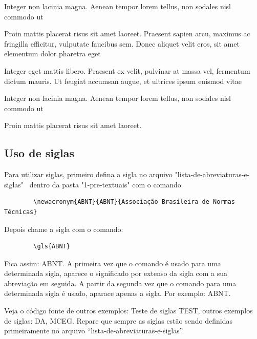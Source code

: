 

    \begin{alineascomponto}
	    \item Integer non lacinia magna. Aenean tempor lorem tellus, non sodales nisl commodo ut
	    \item Proin mattis placerat risus sit amet laoreet. Praesent sapien arcu, maximus ac fringilla efficitur, vulputate faucibus sem. Donec aliquet velit eros, sit amet elementum dolor pharetra eget
	    \item Integer eget mattis libero. Praesent ex velit, pulvinar at massa vel, fermentum dictum mauris. Ut feugiat accumsan augue, et ultrices ipsum euismod vitae
	    \begin{subalineascomponto}
		    \item Integer non lacinia magna. Aenean tempor lorem tellus, non sodales nisl commodo ut
		    \item Proin mattis placerat risus sit amet laoreet.
	    \end{subalineascomponto}
    \end{alineascomponto}

\subsection{Uso de siglas} \label{sec:siglas}

    Para utilizar siglas, primeiro defina a sigla no arquivo "lista-de-abreviaturas-e-siglas"~ dentro da pasta "1-pre-textuais" com o comando 
    \begin{verbatim}
        \newacronym{ABNT}{ABNT}{Associação Brasileira de Normas Técnicas}
    \end{verbatim}
    Depois chame a sigla com o comando:
    \begin{verbatim}
        \gls{ABNT}
    \end{verbatim}
    Fica assim: \gls{ABNT}. A primeira vez que o comando é usado para uma determinada sigla, aparece o significado por extenso da sigla com a sua abreviação em seguida. A partir da segunda vez que o comando para uma determinada sigla é usado, aparace apenas a sigla. Por exemplo: \gls{ABNT}.  
    
    Veja o código fonte de outros exemplos: Teste de siglas \gls{TEST}, outros exemplos de siglas: \gls{DA}, \gls{MCEG}. 
    Repare que sempre as siglas estão sendo definidas primeiramente no arquivo ``lista-de-abreviaturas-e-siglas''.
